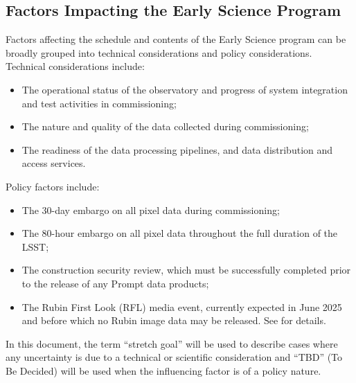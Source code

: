 \subsection{Factors Impacting the Early Science Program }
\label{ssec:impact}

Factors affecting the schedule and contents of the Early Science program can be broadly grouped into technical considerations and policy considerations. 
Technical considerations include:
\begin{itemize}
\item The operational status of the observatory and progress of system integration and test activities in commissioning; 
\item The nature and quality of the data collected during commissioning; 
\item The readiness of the data processing pipelines, and data distribution and access services. 
\end{itemize}
Policy factors include:
\begin{itemize}
\item The 30-day embargo on all pixel data during commissioning;
\item The 80-hour embargo on all pixel data throughout the full duration of the LSST; 
\item The  construction security review, which must be successfully completed prior to the release of any Prompt data products;
\item The Rubin First Look (RFL) media event, currently expected in June 2025 and before which  no Rubin image data may be released. See  for details. 
\end{itemize}
In this document, the term ``stretch goal'' will be used to describe cases where any uncertainty is due to a technical or scientific consideration and ``TBD'' (To Be Decided) will be used when the influencing factor is of a policy nature. 